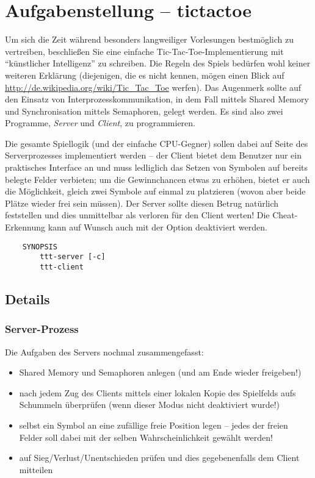 




\section*{Aufgabenstellung -- tictactoe}

Um sich die Zeit während besonders langweiliger Vorlesungen bestmöglich
zu vertreiben, beschließen Sie eine einfache Tic-Tac-Toe-Implementierung
mit "`künstlicher Intelligenz"' zu schreiben. Die Regeln des Spiels bedürfen
wohl keiner weiteren Erklärung (diejenigen, die es nicht kennen, mögen einen
Blick auf \url{http://de.wikipedia.org/wiki/Tic_Tac_Toe} werfen). Das Augenmerk
sollte auf den Einsatz von Interprozesskommunikation, in dem Fall
mittels Shared Memory und Synchronisation mittels Semaphoren, gelegt werden.
Es sind also zwei Programme, \textit{Server} und \textit{Client}, zu
programmieren.

Die gesamte Spiellogik (und der einfache CPU-Gegner) sollen dabei auf Seite des
Serverprozesses implementiert werden -- der Client bietet dem Benutzer nur
ein praktisches Interface an und muss ledliglich das Setzen von Symbolen auf
bereits belegte Felder verbieten; um die Gewinnchancen etwas zu erhöhen, bietet
er auch die Möglichkeit, gleich zwei Symbole auf einmal zu platzieren (wovon
aber beide Plätze wieder frei sein müssen). Der Server sollte diesen Betrug
natürlich feststellen und dies unmittelbar als verloren für den Client werten!
Die Cheat-Erkennung kann auf Wunsch auch mit der Option  deaktiviert
werden.

\begin{verbatim}
    SYNOPSIS
        ttt-server [-c]
        ttt-client
\end{verbatim}

\subsection*{Details}
\subsubsection*{Server-Prozess}

Die Aufgaben des Servers nochmal zusammengefasst:

\begin{itemize}
\item Shared Memory und Semaphoren anlegen (und am Ende wieder freigeben!)
\item nach jedem Zug des Clients mittels einer lokalen Kopie des Spielfelds aufs
  Schummeln überprüfen (wenn dieser Modus nicht deaktiviert wurde!)
\item selbst ein Symbol an eine zufällige freie Position legen -- jedes der
  freien Felder soll dabei mit der selben Wahrscheinlichkeit gewählt werden!
\item auf Sieg/Verlust/Unentschieden prüfen und dies gegebenenfalls dem Client
  mitteilen
\end{itemize}

